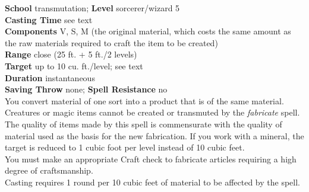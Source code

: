 \textbf{School} transmutation; \textbf{Level} sorcerer/wizard 5\\
\textbf{Casting Time} see text\\
\textbf{Components} V, S, M (the original material, which costs the same amount as the raw materials required to craft the item to be created)\\
\textbf{Range} close (25 ft. + 5 ft./2 levels)\\
\textbf{Target} up to 10 cu. ft./level; see text\\
\textbf{Duration} instantaneous\\
\textbf{Saving Throw} none; \textbf{Spell Resistance} no\\
You convert material of one sort into a product that is of the same material. Creatures or magic items cannot be created or transmuted by the \textit{fabricate }spell. The quality of items made by this spell is commensurate with the quality of material used as the basis for the new fabrication. If you work with a mineral, the target is reduced to 1 cubic foot per level instead of 10 cubic feet.\\
You must make an appropriate Craft check to fabricate articles requiring a high degree of craftsmanship.\\
Casting requires 1 round per 10 cubic feet of material to be affected by the spell.\\
